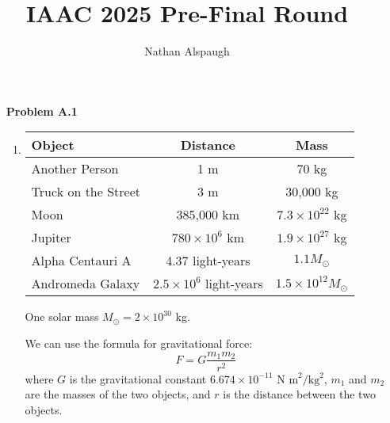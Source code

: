 \documentclass{article}
\title{IAAC 2025 Pre-Final Round}
\author{Nathan Alspaugh}
\theoremstyle{plain}
\begin{document}
\maketitle
\begin{enumerate}
    \item[\textbf{Problem A.1}]

          \begin{enumerate}[label=(\alph*)]
              \item

                    \begin{table}[h]
                        \centering
                        \begin{tabular}{|l|c|c|}
                            \hline
                            \textbf{Object}     & \textbf{Distance}             & \textbf{Mass}                  \\
                            \hline
                            Another Person      & 1 m                           & 70 kg                          \\
                            \hline
                            Truck on the Street & 3 m                           & 30,000 kg                      \\
                            \hline
                            Moon                & 385,000 km                    & $7.3 \times 10^{22}$ kg        \\
                            \hline
                            Jupiter             & $780 \times 10^6$ km          & $1.9 \times 10^{27}$ kg        \\
                            \hline
                            Alpha Centauri A    & 4.37 light-years              & $1.1 M_{\odot}$                \\
                            \hline
                            Andromeda Galaxy    & $2.5 \times 10^6$ light-years & $1.5 \times 10^{12} M_{\odot}$ \\
                            \hline
                        \end{tabular}
                    \end{table}

                    One solar mass $M_{\odot} = 2 \times 10^{30}$ kg.

                    We can use the formula for gravitational force:
                    \[
                        F = G \frac{m_1 m_2}{r^2}
                    \]
                    where $G$ is the gravitational constant $6.674 \times 10^{-11} \text{ N m}^2/\text{kg}^2$, $m_1$ and $m_2$ are the masses of the two objects, and $r$ is the distance between the two objects.


\end{enumerate}
\end{enumerate}
\end{document}
